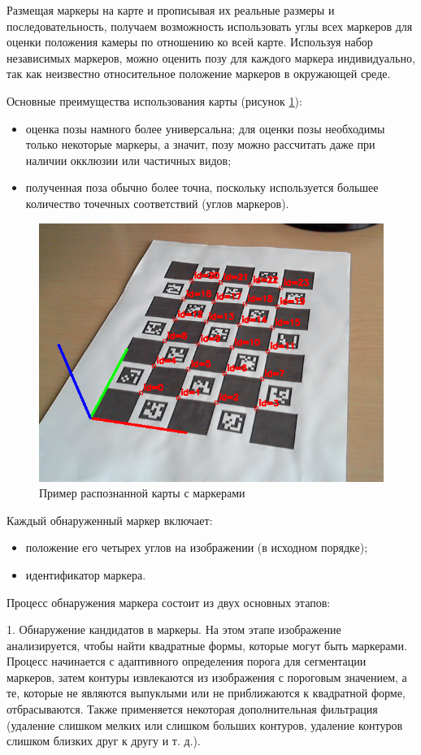 Размещая маркеры на карте и прописывая их реальные размеры и последовательность, получаем возможность использовать углы всех маркеров для оценки положения камеры по отношению ко всей карте.
Используя набор независимых маркеров, можно оценить позу для каждого маркера индивидуально, так как неизвестно относительное положение маркеров в окружающей среде.

Основные преимущества использования карты (рисунок \ref{fig:aruc}):
\begin{itemize}
\item оценка позы намного более универсальна; для оценки позы необходимы только некоторые маркеры, а значит, позу можно рассчитать даже при наличии окклюзии или частичных видов;
\item полученная поза обычно более точна, поскольку используется большее количество точечных соответствий (углов маркеров).
\end{itemize}
\begin{figure}[H]
	\centering
	\includegraphics[width=0.5\linewidth]{pics/aruc}
	\caption{Пример распознанной карты с маркерами
	}
	\label{fig:aruc}
\end{figure}

Каждый обнаруженный маркер включает:
\begin{itemize}
\item положение его четырех углов на изображении (в исходном порядке);
\item идентификатор маркера.
\end{itemize}

Процесс обнаружения маркера состоит из двух основных этапов:

1. Обнаружение кандидатов в маркеры. На этом этапе изображение анализируется, чтобы найти квадратные формы, которые могут быть маркерами. Процесс начинается с адаптивного определения порога для сегментации маркеров, затем контуры извлекаются из изображения с пороговым значением, а те, которые не являются выпуклыми или не приближаются к квадратной форме, отбрасываются. Также применяется некоторая дополнительная фильтрация (удаление слишком мелких или слишком больших контуров, удаление контуров слишком близких друг к другу и т. д.).

